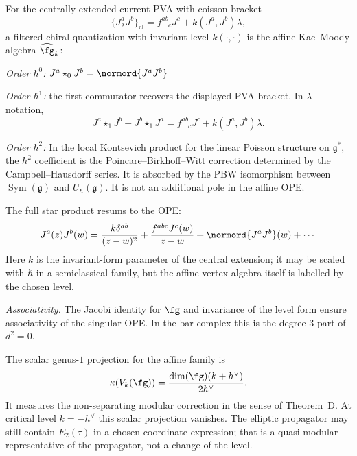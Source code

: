 \begin{computation}
\label{comp:current-star-product}

For the centrally extended current PVA with coisson bracket
\[
\{J^a_\lambda J^b\}_{\mathrm{cl}}
=f^{ab}_{\phantom{ab}c}J^c+k(J^a,J^b)\lambda,
\]
a filtered chiral quantization with invariant level \(k(\cdot,\cdot)\)
is the affine Kac--Moody algebra
$\widehat{\fg}_k$:

\emph{Order $\hbar^0$:} $J^a \star_0 J^b = \normord{J^a J^b}$

\emph{Order $\hbar^1$:}
the first commutator recovers the displayed PVA bracket. In
\(\lambda\)-notation,
\[
J^a\star_1J^b-J^b\star_1J^a
=f^{ab}_{\phantom{ab}c}J^c+k(J^a,J^b)\lambda .
\]

\emph{Order $\hbar^2$:}
In the local Kontsevich product for the linear Poisson structure on
$\mathfrak g^*$, the $\hbar^2$ coefficient is the
Poincare--Birkhoff--Witt correction determined by the Campbell--Hausdorff
series. It is absorbed by the PBW isomorphism between
\(\operatorname{Sym}(\mathfrak g)\) and \(U_\hbar(\mathfrak g)\).
It is not an additional pole in the affine OPE.

The full star product resums to the OPE:
\begin{equation}\label{eq:km-as-deformation}
J^a(z) J^b(w) = \frac{k \delta^{ab}}{(z-w)^2}
+ \frac{f^{abc} J^c(w)}{z-w} + \normord{J^a J^b}(w) + \cdots
\end{equation}
Here $k$ is the invariant-form parameter of the central extension; it
may be scaled with $\hbar$ in a semiclassical family, but the affine
vertex algebra itself is labelled by the chosen level.

\emph{Associativity.}
The Jacobi identity for $\fg$ and invariance of the level form ensure
associativity of the singular OPE. In the bar complex this is the
degree-$3$ part of $d^2=0$.
\end{computation}

\begin{remark}
\label{rem:quantization-curvature-connection}
The scalar genus-$1$ projection for the affine family is
\[
\kappa(V_k(\fg))=\frac{\dim(\fg)(k+h^\vee)}{2h^\vee}.
\]
It measures the non-separating modular correction in the sense of
Theorem~D. At critical level $k=-h^\vee$ this scalar projection
vanishes. The elliptic propagator may still contain $E_2(\tau)$ in a
chosen coordinate expression; that is a quasi-modular representative
of the propagator, not a change of the level.
\end{remark}


